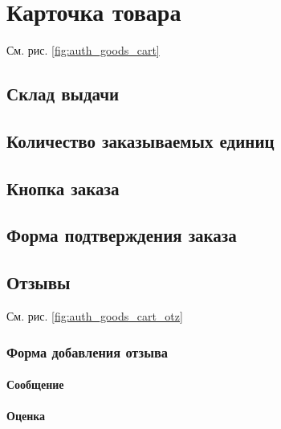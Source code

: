         
     \section{Карточка товара}

        См. рис. \ref{fig:auth_goods_cart}
     
        \subsection{Склад выдачи}
        \subsection{Количество заказываемых единиц}
        \subsection{Кнопка заказа}
        \subsection{Форма подтверждения заказа}
        \subsection{Отзывы}

            См. рис. \ref{fig:auth_goods_cart_otz}
        
            \subsubsection{Форма добавления отзыва}
                \paragraph{Сообщение}
                \paragraph{Оценка}

